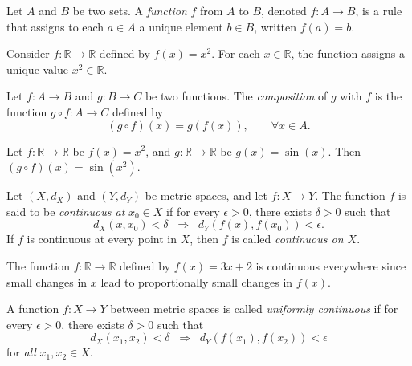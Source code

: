 \begin{definition}[Function]
Let $A$ and $B$ be two sets.  
A \emph{function} $f$ from $A$ to $B$, denoted $f:A \to B$, is a rule that assigns to each $a \in A$ a unique element $b \in B$, written $f(a) = b$.  
\end{definition}

\begin{example}
Consider $f:\mathbb{R} \to \mathbb{R}$ defined by $f(x) = x^2$.  
For each $x \in \mathbb{R}$, the function assigns a unique value $x^2 \in \mathbb{R}$.  
\end{example}

\begin{definition}
Let $f:A \to B$ and $g:B \to C$ be two functions.  
The \emph{composition} of $g$ with $f$ is the function $g \circ f : A \to C$ defined by
\begin{equation}
(g \circ f)(x) = g(f(x)), \qquad \forall x \in A.
\end{equation}
\end{definition}

\begin{example}
Let $f:\mathbb{R}\to \mathbb{R}$ be $f(x)=x^2$, and $g:\mathbb{R}\to \mathbb{R}$ be $g(x)=\sin(x)$.  
Then $(g \circ f)(x) = \sin(x^2)$.  
\end{example}

\begin{definition}
Let $(X,d_X)$ and $(Y,d_Y)$ be metric spaces, and let $f:X \to Y$.  
The function $f$ is said to be \emph{continuous at} $x_0 \in X$ if for every $\epsilon > 0$, there exists $\delta > 0$ such that
\begin{equation}
d_X(x,x_0) < \delta \;\;\Rightarrow\;\; d_Y(f(x), f(x_0)) < \epsilon.
\end{equation}
If $f$ is continuous at every point in $X$, then $f$ is called \emph{continuous on $X$}.  
\end{definition}

\begin{example}
The function $f:\mathbb{R}\to \mathbb{R}$ defined by $f(x) = 3x+2$ is continuous everywhere since small changes in $x$ lead to proportionally small changes in $f(x)$.  
\end{example}

\begin{definition}
A function $f:X \to Y$ between metric spaces is called \emph{uniformly continuous} if for every $\epsilon > 0$, there exists $\delta > 0$ such that
\begin{equation}
d_X(x_1,x_2) < \delta \;\;\Rightarrow\;\; d_Y(f(x_1), f(x_2)) < \epsilon
\end{equation}
for \emph{all} $x_1, x_2 \in X$.  
\end{definition}


